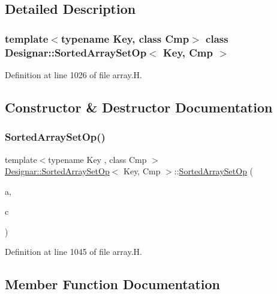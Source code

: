 \subsection{Detailed Description}
\subsubsection*{template$<$typename Key, class Cmp$>$\newline
class Designar\+::\+Sorted\+Array\+Set\+Op$<$ Key, Cmp $>$}



Definition at line 1026 of file array.\+H.



\subsection{Constructor \& Destructor Documentation}
\mbox{\label{class_designar_1_1_sorted_array_set_op_a2d732318892f21ead8d988b5a76a016b}} 
\subsubsection{\texorpdfstring{Sorted\+Array\+Set\+Op()}{SortedArraySetOp()}}
{\footnotesize\ttfamily template$<$typename Key , class Cmp $>$ \\
\hyperlink{class_designar_1_1_sorted_array_set_op}{Designar\+::\+Sorted\+Array\+Set\+Op}$<$ Key, Cmp $>$\+::\hyperlink{class_designar_1_1_sorted_array_set_op}{Sorted\+Array\+Set\+Op} (\begin{DoxyParamCaption}\item[{\hyperlink{class_designar_1_1_dyn_array}{Dyn\+Array}$<$ Key $>$ \&}]{a,  }\item[{Cmp \&}]{c }\end{DoxyParamCaption})\hspace{0.3cm}{\ttfamily [inline]}}



Definition at line 1045 of file array.\+H.



\subsection{Member Function Documentation}
\mbox{\label{class_designar_1_1_sorted_array_set_op_adef257a4a2debcef385f570b1cd72037}} 
